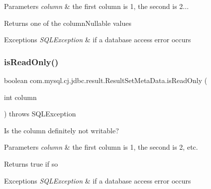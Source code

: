 \begin{DoxyParams}{Parameters}
{\em column} & the first column is 1, the second is 2...\\
\hline
\end{DoxyParams}
\begin{DoxyReturn}{Returns}
one of the column\+Nullable values
\end{DoxyReturn}

\begin{DoxyExceptions}{Exceptions}
{\em S\+Q\+L\+Exception} & if a database access error occurs \\
\hline
\end{DoxyExceptions}
\mbox{\label{classcom_1_1mysql_1_1cj_1_1jdbc_1_1result_1_1_result_set_meta_data_abecd50fda9e5c9639b59ac1d0c6d0591}} 
\subsubsection{\texorpdfstring{is\+Read\+Only()}{isReadOnly()}}
{\footnotesize\ttfamily boolean com.\+mysql.\+cj.\+jdbc.\+result.\+Result\+Set\+Meta\+Data.\+is\+Read\+Only (\begin{DoxyParamCaption}\item[{int}]{column }\end{DoxyParamCaption}) throws S\+Q\+L\+Exception}

Is the column definitely not writable?


\begin{DoxyParams}{Parameters}
{\em column} & the first column is 1, the second is 2, etc.\\
\hline
\end{DoxyParams}
\begin{DoxyReturn}{Returns}
true if so
\end{DoxyReturn}

\begin{DoxyExceptions}{Exceptions}
{\em S\+Q\+L\+Exception} & if a database access error occurs \\
\hline
\end{DoxyExceptions}
\mbox{\label{classcom_1_1mysql_1_1cj_1_1jdbc_1_1result_1_1_result_set_meta_data_a8f2d4be02326a811c85758f8e2d59313}} 
